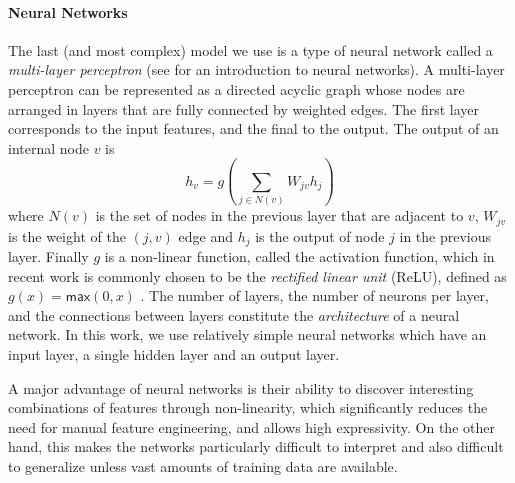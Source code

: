 \paragraph{Neural Networks}
%
The last (and most complex) model we use is a type of neural network
called a \emph{multi-layer perceptron} (see \citet{Nielsen2015-pu} for
an introduction to neural networks).
%
A multi-layer perceptron can be represented as a directed acyclic
graph whose nodes are arranged in layers that are fully connected by
weighted edges.
%
The first layer corresponds to the input features, and the final to the
output.
%
The output of an internal node $v$ is
%
\[ h_v = g(\sum_{j \in N(v)} W_{jv} h_j ) \]
%
where $N(v)$ is the set of nodes in the previous layer that are adjacent
to $v$, $W_{jv}$ is the weight of the $(j, v)$ edge and $h_j$ is the
output of node $j$ in the previous layer.
%
Finally $g$ is a non-linear function, called the activation function,
which in recent work is commonly chosen to be the \emph{rectified linear
  unit} (ReLU), defined as $g(x) = \mathsf{max}(0,x)$
\citep{Nair2010-xg}.
%
The number of layers, the number of neurons per layer, and the
connections between layers constitute the \emph{architecture} of a
neural network.
%
In this work, we use relatively simple neural networks which have an
input layer, a single hidden layer and an output layer.

A major advantage of neural networks is their ability to discover
interesting combinations of features through non-linearity, which
significantly reduces the need for manual feature engineering, and
allows high expressivity.
%
On the other hand, this makes the networks particularly difficult to
interpret and also difficult to generalize unless vast amounts of
training data are available.

%
%
%
%
%

